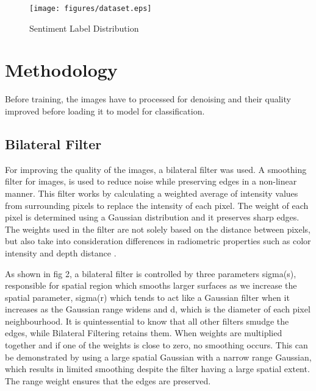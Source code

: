 \documentclass[conference]{IEEEtran}
\begin{document}
\begin{figure}[htbp]
\texttt{[image: figures/dataset.eps]}
\caption{Sentiment Label Distribution}
\label{fig}
\end{figure}

\section{Methodology}

Before training, the images have to processed for denoising and their quality improved before loading it to model for classification. 

\subsection{Bilateral Filter}
For improving the quality of the images, a bilateral filter was used. A smoothing filter for images, is used to reduce noise while preserving edges in a non-linear manner. This filter works by calculating a weighted average of intensity values from surrounding pixels to replace the intensity of each pixel. The weight of each pixel is determined using a Gaussian distribution and it preserves sharp edges. The weights used in the filter are not solely based on the distance between pixels, but also take into consideration differences in radiometric properties such as color intensity and depth distance \cite{b15}.


As shown in fig 2, a bilateral filter is controlled by three parameters sigma(s), responsible for spatial region which smooths larger surfaces as we increase the spatial parameter, sigma(r) which tends to act like a Gaussian filter when it increases as the Gaussian range widens and d, which is the diameter of each pixel neighbourhood. It is quintessential to know that all other filters smudge the edges, while Bilateral Filtering retains them. When weights are multiplied together and if one of the weights is close to zero, no smoothing occurs. This can be demonstrated by using a large spatial Gaussian with a narrow range Gaussian, which results in limited smoothing despite the filter having a large spatial extent. The range weight ensures that the edges are preserved.
\end{document}
